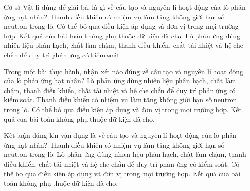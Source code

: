 \begin{ex}
Cơ sở Vật lí đúng để giải bài là gì về cấu tạo và nguyên lí hoạt động của lò phản ứng hạt nhân?
\choice
{Thanh điều khiển có nhiệm vụ làm tăng không giới hạn số neutron trong lò.}
{Có thể bỏ qua điều kiện áp dụng và đơn vị trong mọi trường hợp.}
{Kết quả của bài toán không phụ thuộc dữ kiện đã cho.}
{\True Lò phản ứng dùng nhiên liệu phân hạch, chất làm chậm, thanh điều khiển, chất tải nhiệt và hệ che chắn để duy trì phản ứng có kiểm soát.}
\end{ex}

\begin{ex}
Trong một bài thực hành, nhận xét nào đúng về cấu tạo và nguyên lí hoạt động của lò phản ứng hạt nhân?
\choice
{\True Lò phản ứng dùng nhiên liệu phân hạch, chất làm chậm, thanh điều khiển, chất tải nhiệt và hệ che chắn để duy trì phản ứng có kiểm soát.}
{Thanh điều khiển có nhiệm vụ làm tăng không giới hạn số neutron trong lò.}
{Có thể bỏ qua điều kiện áp dụng và đơn vị trong mọi trường hợp.}
{Kết quả của bài toán không phụ thuộc dữ kiện đã cho.}
\end{ex}

\begin{ex}
Kết luận đúng khi vận dụng là về cấu tạo và nguyên lí hoạt động của lò phản ứng hạt nhân?
\choice
{Thanh điều khiển có nhiệm vụ làm tăng không giới hạn số neutron trong lò.}
{\True Lò phản ứng dùng nhiên liệu phân hạch, chất làm chậm, thanh điều khiển, chất tải nhiệt và hệ che chắn để duy trì phản ứng có kiểm soát.}
{Có thể bỏ qua điều kiện áp dụng và đơn vị trong mọi trường hợp.}
{Kết quả của bài toán không phụ thuộc dữ kiện đã cho.}
\end{ex}

